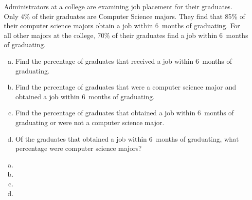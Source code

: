 \documentclass[11pt,letterpaper]{article}
\begin{document}
\newpage



 Administrators at a college are examining job placement for their graduates. Only 4\% of their graduates are Computer Science majors. They find that 85\% of their computer science majors obtain a job within 6~months of graduating. For all other majors at the college, 70\% of their graduates find a job within 6~months of graduating. 
	\begin{enumerate}[(a)]
	\item Find the percentage of graduates that received a job within 6~months of graduating. 
	\item Find the percentage of graduates that were a computer science major and obtained a job within 6~months of graduating.
	\item Find the percentage of graduates that obtained a job within 6~months of graduating or were not a computer science major. 
	\item Of the graduates that obtained a job within 6~months of graduating, what percentage were computer science majors?	
	\end{enumerate} \pspace

\sol 
\begin{enumerate}[(a)]
\item 
\item 
\item 
\item 
\end{enumerate}
\end{document}
